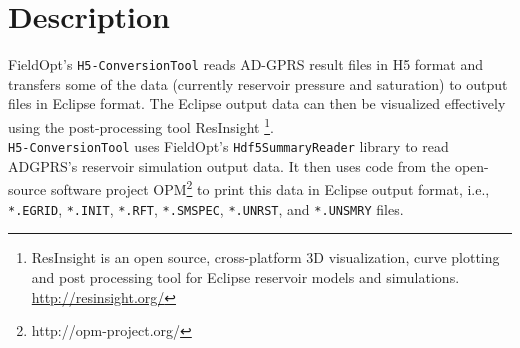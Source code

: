 

\section{Description}

FieldOpt's \texttt{H5-ConversionTool} reads 
AD-GPRS result files in H5 format and transfers
some of the data (currently reservoir pressure 
and saturation) to output files in Eclipse 
format.
% 
The Eclipse output data can then be visualized 
effectively using the post-processing tool 
ResInsight%
\footnote{ResInsight is an open source, cross-platform 
3D visualization, curve plotting and post processing 
tool for Eclipse reservoir models and simulations.
\url{http://resinsight.org/}}.\\


\texttt{H5-ConversionTool} uses FieldOpt's 
\texttt{Hdf5SummaryReader} library to read
ADGPRS's reservoir simulation output data.
% 
It then uses code from the open-source software 
project OPM\footnote{http://opm-project.org/} to 
print this data in Eclipse output format, i.e., 
\texttt{*.EGRID}, \texttt{*.INIT}, \texttt{*.RFT}, 
\texttt{*.SMSPEC}, \texttt{*.UNRST}, and 
\texttt{*.UNSMRY} files.







